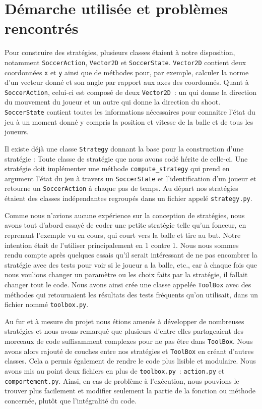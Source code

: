 \documentclass[a4paper,12pt]{article}
\begin{document}
\section{Démarche utilisée et problèmes rencontrés}

Pour construire des stratégies, plusieurs classes étaient à notre disposition, notamment \texttt{SoccerAction}, \texttt{Vector2D} et \texttt{SoccerState}. \texttt{Vector2D} contient deux coordonnées \texttt{x} et \texttt{y} ainsi que de méthodes pour, par exemple, calculer la norme d’un vecteur donné et son angle par rapport aux axes des coordonnés. Quant à \texttt{SoccerAction}, celui-ci est composé de deux \texttt{Vector2D} : un qui donne la direction du mouvement du joueur et un autre qui donne la direction du shoot. \texttt{SoccerState} contient toutes les informations nécessaires pour connaitre l’état du jeu à un moment donné y compris la position et vitesse de la balle et de tous les joueurs. 

Il existe déjà une classe \texttt{Strategy} donnant la base pour la construction d'une stratégie : Toute classe de stratégie que nous avons codé hérite de celle-ci. Une stratégie doit implémenter une méthode \texttt{compute\_strategy} qui prend en argument l'état du jeu à travers un \texttt{SoccerState} et l'identification d'un joueur et retourne un \texttt{SoccerAction} à chaque pas de temps. Au départ nos stratégies étaient des classes indépendantes regroupés dans un fichier appelé \texttt{strategy.py}.
	
Comme nous n’avions aucune expérience sur la conception de stratégies, nous avons tout d’abord essayé de coder une petite stratégie telle qu’un fonceur, en reprenant l’exemple vu en cours, qui court vers la balle et tire au but. Notre intention était de l’utiliser principalement en 1 contre 1. Nous nous sommes rendu compte après quelques essais qu’il serait intéressant de ne pas encombrer la stratégie avec des tests pour voir si le joueur a la balle, etc., car à chaque fois que nous voulions changer un paramètre ou les choix faits par la stratégie, il fallait changer tout le code. Nous avons ainsi crée une classe appelée \texttt{ToolBox} avec des méthodes qui retournaient les résultats des tests fréquents qu’on utilisait, dans un fichier nommé \texttt{toolbox.py}.

Au fur et à mesure du projet nous étions amenés à développer de nombreuses stratégies et nous avons remarqué que plusieurs d'entre elles partageaient des morceaux de code suffisamment complexes pour ne pas être dans \texttt{ToolBox}. Nous avons alors rajouté de couches entre nos stratégies et \texttt{ToolBox} en créant d'autres classes. Cela a permis également de rendre le code plus lisible et modulaire. Nous avons mis au point deux fichiers en plus de \texttt{toolbox.py} : \texttt{action.py} et \texttt{comportement.py}. Ainsi, en cas de problème à l’exécution, nous pouvions le trouver plus facilement et modifier seulement la partie de la fonction ou méthode concernée, plutôt que l’intégralité du code.
\end{document}
